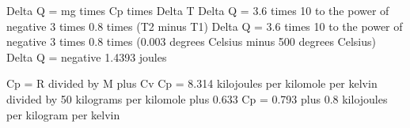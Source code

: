 Delta Q = mg times Cp times Delta T  
Delta Q = 3.6 times 10 to the power of negative 3 times 0.8 times (T2 minus T1)  
Delta Q = 3.6 times 10 to the power of negative 3 times 0.8 times (0.003 degrees Celsius minus 500 degrees Celsius)  
Delta Q = negative 1.4393 joules  

Cp = R divided by M plus Cv  
Cp = 8.314 kilojoules per kilomole per kelvin divided by 50 kilograms per kilomole plus 0.633  
Cp = 0.793 plus 0.8 kilojoules per kilogram per kelvin